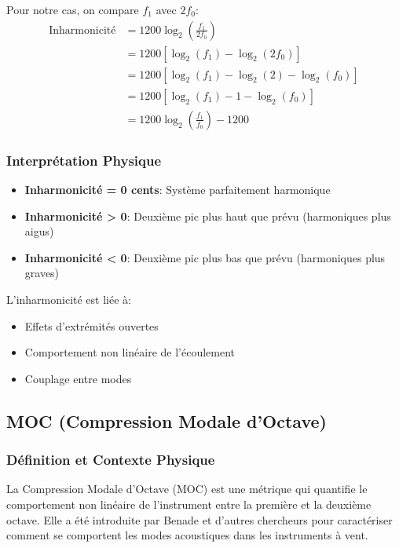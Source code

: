 \documentclass[12pt,a4paper,twocolumn]{article}
\newcommand{\freqzero}{f_0}
\newcommand{\freqone}{f_1}
\begin{document}
Pour notre cas, on compare $\freqone$ avec $2\freqzero$:
\begin{align}
\text{Inharmonicité} &= 1200 \log_2\left(\frac{\freqone}{2\freqzero}\right) \\
&= 1200 \left[\log_2(\freqone) - \log_2(2\freqzero)\right] \\
&= 1200 \left[\log_2(\freqone) - \log_2(2) - \log_2(\freqzero)\right] \\
&= 1200 \left[\log_2(\freqone) - 1 - \log_2(\freqzero)\right] \\
&= 1200 \log_2\left(\frac{\freqone}{\freqzero}\right) - 1200
\label{eq:inharmonicite_deriv}
\end{align}

\subsubsection{Interprétation Physique}

\begin{itemize}
    \item \textbf{Inharmonicité = 0 cents}: Système parfaitement harmonique
    \item \textbf{Inharmonicité > 0}: Deuxième pic plus haut que prévu (harmoniques plus aigus)
    \item \textbf{Inharmonicité < 0}: Deuxième pic plus bas que prévu (harmoniques plus graves)
\end{itemize}

L'inharmonicité est liée à:
\begin{itemize}
    \item Effets d'extrémités ouvertes
    \item Comportement non linéaire de l'écoulement
    \item Couplage entre modes
\end{itemize}

\subsection{MOC (Compression Modale d'Octave)}

\subsubsection{Définition et Contexte Physique}

La Compression Modale d'Octave (MOC) est une métrique qui quantifie le comportement non linéaire de l'instrument entre la première et la deuxième octave. Elle a été introduite par Benade et d'autres chercheurs pour caractériser comment se comportent les modes acoustiques dans les instruments à vent.
\end{document}

